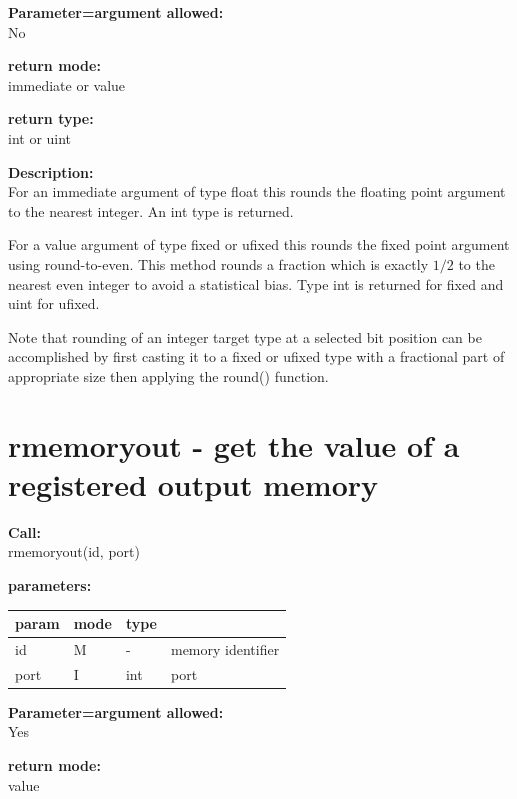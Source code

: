         {\bf Parameter=argument allowed:} \\
        No
        
        {\bf return mode:} \\
        immediate or value

        {\bf return type:} \\
        int or uint
        
        {\bf Description:} \\
        For an immediate argument of type float this rounds the floating point
        argument to the nearest integer. An int type is returned.
        
        For a value argument of type fixed or ufixed this rounds the
        fixed point argument using round-to-even. This method rounds a
        fraction which is exactly $1/2$ to the nearest even integer to avoid
        a statistical bias. Type int is returned for fixed and uint for ufixed.
        
        Note that rounding of an integer target type at a selected bit position
        can be accomplished by first casting it to a fixed or ufixed type with a
        fractional part of appropriate size then applying the round() function.



    \section{rmemoryout - get the value of a registered output memory}\label{sec:ifrmemoryout}
       
        {\bf Call:} \\
        rmemoryout(id, port)
        
        {\bf parameters:} \\
        \begin{tabular}{| l | l | l | l |}
        \hline
        param  & mode & type & \\
        \hline \hline
        id   & M &  -  & memory identifier  \\ \hline
        port & I & int & port               \\ \hline
        \end{tabular}
        
        {\bf Parameter=argument allowed:} \\
        Yes
        
        {\bf return mode:} \\
        value

